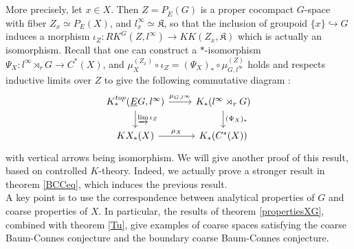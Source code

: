 More precisely, let $x\in X$. Then $Z=P_{\overline E}(G)$ is a proper cocompact $G$-space with fiber $Z_x\simeq P_E(X)$, and $l^\infty_x \simeq \mathfrak K$, so that the inclusion of groupoid $\{x\}\hookrightarrow G $ induces a morphism $\iota_Z : RK^G(Z,l^\infty)\rightarrow KK(Z_x,\mathfrak K)$ which is actually an isomorphism. Recall that one can construct a $*$-isomorphism $\Psi_X: l^\infty \rtimes_r G\rightarrow C^*(X)$, and $\mu_X^{(Z_x)}\circ \iota_Z = (\Psi_X)_*\circ \mu_{G,l^\infty}^{(Z)}$ holds and respects inductive limits over $Z$ to give the following commutative diagram :
\[\begin{tikzcd}
K_*^{top}(\underline E G, l^\infty) \arrow{r}{\mu_{G,l^\infty}}\arrow{d}{\varinjlim \iota_Z} & K_*(l^\infty\rtimes_r G)\arrow{d}{(\Psi_X)_*} \\
KX_*(X)\arrow{r}{\mu_X} & K_*(C^*(X))
\end{tikzcd}\]  
with vertical arrows being isomorphism. We will give another proof of this result, based on controlled $K$-theory. Indeed, we actually prove a stronger result in theorem \ref{BCCeq}, which induces the previous result. \\

A key point is to use the correspondence between analytical properties of $G$ and coarse properties of $X$. In particular, the results of theorem \ref{propertiesXG}, combined with theorem \ref{Tu}, give examples of coarse spaces satisfying the coarse Baum-Connes conjecture and the boundary coarse Baum-Connes conjecture.

















